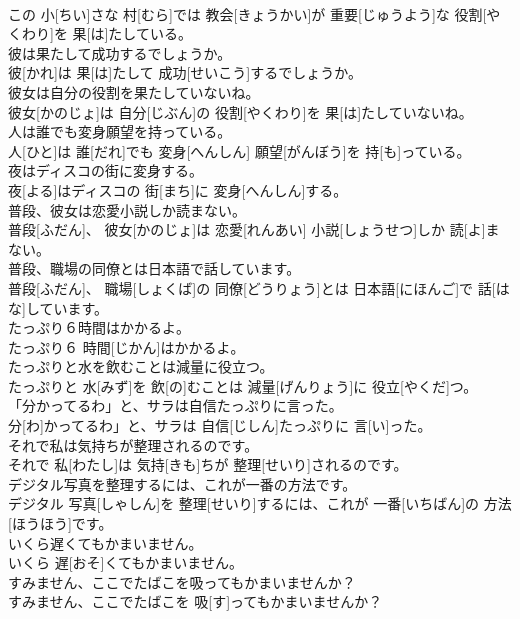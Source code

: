 \documentclass[8pt]{extreport}
\begin{document}
\begin{CJK}{UTF8}{min}
\\	この 小[ちい]さな 村[むら]では 教会[きょうかい]が 重要[じゅうよう]な 役割[やくわり]を 果[は]たしている。	
\\	彼は果たして成功するでしょうか。	
\\	彼[かれ]は 果[は]たして 成功[せいこう]するでしょうか。	
\\	彼女は自分の役割を果たしていないね。	
\\	彼女[かのじょ]は 自分[じぶん]の 役割[やくわり]を 果[は]たしていないね。	
\\	人は誰でも変身願望を持っている。	
\\	人[ひと]は 誰[だれ]でも 変身[へんしん] 願望[がんぼう]を 持[も]っている。	
\\	夜はディスコの街に変身する。	
\\	夜[よる]はディスコの 街[まち]に 変身[へんしん]する。	
\\	普段、彼女は恋愛小説しか読まない。	
\\	普段[ふだん]、 彼女[かのじょ]は 恋愛[れんあい] 小説[しょうせつ]しか 読[よ]まない。	
\\	普段、職場の同僚とは日本語で話しています。	
\\	普段[ふだん]、 職場[しょくば]の 同僚[どうりょう]とは 日本語[にほんご]で 話[はな]しています。	
\\	たっぷり６時間はかかるよ。	
\\	たっぷり６ 時間[じかん]はかかるよ。	
\\	たっぷりと水を飲むことは減量に役立つ。	
\\	たっぷりと 水[みず]を 飲[の]むことは 減量[げんりょう]に 役立[やくだ]つ。	
\\	「分かってるわ」と、サラは自信たっぷりに言った。	
\\	分[わ]かってるわ」と、サラは 自信[じしん]たっぷりに 言[い]った。	
\\	それで私は気持ちが整理されるのです。	
\\	それで 私[わたし]は 気持[きも]ちが 整理[せいり]されるのです。	
\\	デジタル写真を整理するには、これが一番の方法です。	
\\	デジタル 写真[しゃしん]を 整理[せいり]するには、これが 一番[いちばん]の 方法[ほうほう]です。	
\\	いくら遅くてもかまいません。	
\\	いくら 遅[おそ]くてもかまいません。	
\\	すみません、ここでたばこを吸ってもかまいませんか？	
\\	すみません、ここでたばこを 吸[す]ってもかまいませんか？	

\end{CJK}
\end{document}
